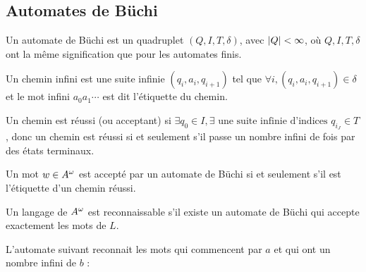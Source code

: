 \subsection{Automates de Büchi}

\begin{definition}
	Un automate de Büchi est un quadruplet $(Q,I,T,\delta)$, avec $\left|Q\right| < \infty$, où
	$Q,I,T,\delta$ ont la même signification que pour les automates finis.
\end{definition}

\begin{definition}
	Un chemin infini est une suite infinie $(q_i,a_i,q_{i+1})$ tel que $\forall i, (q_i,a_i,q_{i+1}) \in \delta$ et le mot
	infini $a_0a_1\cdots$ est dit l'étiquette du chemin.
\end{definition}


\begin{definition}
	Un chemin est réussi (ou acceptant) si $\exists q_0 \in I, \exists \text{ une suite infinie d'indices } q_{i_J} \in T$,
	donc un chemin est réussi si et seulement s'il passe un nombre infini de fois par des états terminaux.
\end{definition}

\begin{definition}
	Un mot $w \in A^{\omega}$ est accepté par un automate de Büchi si et seulement s'il est l'étiquette d'un chemin réussi.
\end{definition}


\begin{definition}
	Un langage de $A^{\omega}$ est reconnaissable s'il existe un automate de Büchi qui accepte exactement les mots de $L$.
\end{definition}


\begin{exemple}
	L'automate suivant reconnait les mots qui commencent par $a$ et qui ont un nombre infini de $b$ :

	\begin{automata}
	\end{automata}
\end{exemple}


